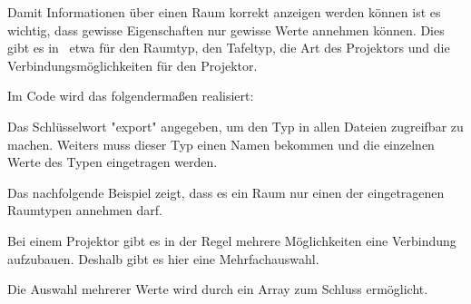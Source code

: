 \label{sec:roomtype}

Damit Informationen über einen Raum korrekt anzeigen werden können ist es wichtig, dass gewisse Eigenschaften nur gewisse Werte annehmen können. Dies gibt es in \ZELIA\ etwa für den Raumtyp, den Tafeltyp, die Art des Projektors und die Verbindungsmöglichkeiten für den Projektor.

Im Code wird das folgendermaßen realisiert:

Das Schlüsselwort "export" angegeben, um den Typ in allen Dateien zugreifbar zu machen. Weiters muss dieser Typ einen Namen bekommen und die einzelnen Werte des Typen eingetragen werden. 

Das nachfolgende Beispiel zeigt, dass es ein Raum nur einen der eingetragenen Raumtypen annehmen darf.


Bei einem Projektor gibt es in der Regel mehrere Möglichkeiten eine Verbindung aufzubauen. Deshalb gibt es hier eine Mehrfachauswahl.

Die Auswahl mehrerer Werte wird durch ein Array zum Schluss ermöglicht.

